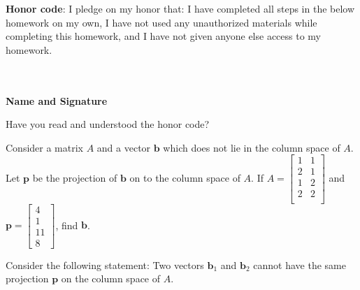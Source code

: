 \documentclass[solution,addpoints,12pt]{exam}
\begin{document}
\noindent \textbf{Honor code}: I pledge on my honor that: I have completed all steps in the below homework on my own, I have not used any unauthorized materials while completing this homework, and I have not given anyone else access to my homework.
\\~\\~\\
\begin{flushright}
\textbf{Name and Signature}

\end{flushright}


\begin{questions}

\question[1] Have you read and understood the honor code?
\begin{solution}

\end{solution}



\question[2] Consider a matrix $A$ and a vector $\mathbf{b}$ which does not lie in the column space of $A$. Let $\mathbf{p}$ be the projection of $\mathbf{b}$ on to the column space of $A$. If $A = \begin{bmatrix}
1&1\\
2&1\\
1&2\\
2&2\\
\end{bmatrix}$ and $\mathbf{p} = \begin{bmatrix}4\\1\\11\\8\end{bmatrix}$, find $\mathbf{b}$.

\begin{solution}

\end{solution}

\question[2] Consider the following statement: Two vectors $\mathbf{b}_1$ and $\mathbf{b}_2$ cannot have the same projection $\mathbf{p}$ on the column space of $A$.

\end{questions}
\end{document}
